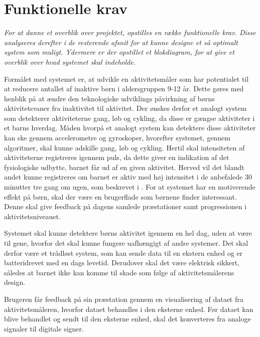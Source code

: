 \section{Funktionelle krav}\label{funktionellekrav}
\textit{For at danne et overblik over projektet, opstilles en række funktionelle krav. Disse analyseres derefter i de resterende afsnit for at kunne designe et så optimalt system som muligt. Ydermere er der opstillet et blokdiagram, for at give et overblik over hvad systemet skal indeholde.}

Formålet med systemet er, at udvikle en aktivitetsmåler som har potentialet til at reducere antallet af inaktive børn i aldersgruppen 9-12 år. Dette gøres med henblik på at ændre den teknologiske udviklings påvirkning af børns aktivitetsvaner fra inaktivitet til aktivitet.
Der ønskes derfor et analogt system som detekterer aktiviteterne gang, løb og cykling, da disse er gængse aktiviteter i et barns hverdag. Måden hvorpå et analogt system kan detektere disse aktiviteter kan ske gennem accelerometre og gyroskoper, hvorefter systemet, gennem algoritmer, skal kunne adskille gang, løb og cykling.
Hertil skal intensiteten af aktiviteterne registreres igennem puls, da dette giver en indikation af det fysiologiske udbytte, barnet får ud af en given aktivitet. Herved vil det blandt andet kunne registreres om barnet er aktiv med høj intensitet i de anbefalede 30 minutter tre gang om ugen, som beskrevet i . \newline
For at systemet har en motiverende effekt på børn, skal der være en brugerflade som børnene finder interessant. Denne skal give feedback på dagens samlede præstationer samt progressionen i aktivitetsniveauet.

Systemet skal kunne detektere børns aktivitet igennem en hel dag, uden at være til gene, hvorfor det skal kunne fungere uafhængigt af andre systemer. Det skal derfor være et trådløst system, som kan sende data til en ekstern enhed og er batteridrevet med en dags levetid. Derudover skal det være elektrisk sikkert, således at barnet ikke kan komme til skade som følge af aktivitetsmålerens design. 

Brugeren får feedback på sin præstation gennem en visualisering af dataet fra aktivitetsmåleren, hvorfor dataet behandles i den eksterne enhed. \newline
Før dataet kan blive behandlet og sendt til den eksterne enhed, skal det konverteres fra analoge signaler til digitale signer. 

